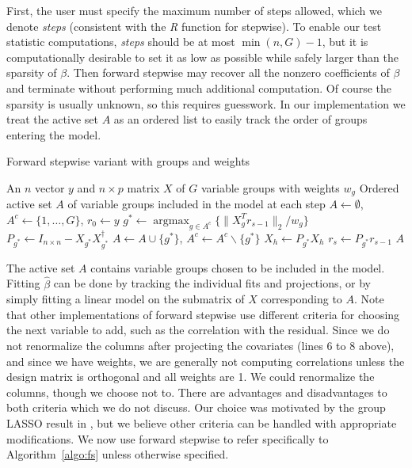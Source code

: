 \documentclass{imsart}
\newcommand{\argmax}{\mathop{\mathrm{argmax}}}
\newcommand{\norm}[1]{\lVert #1 \rVert}
\begin{document}
First, the user must specify the maximum number of steps allowed,
which we denote \textit{steps} (consistent with the \textit{R} function
for stepwise). To enable our test statistic computations,
\textit{steps} should be at most $\min (n, G) - 1$, but it is
computationally desirable to set it as low as possible while
safely larger than the sparsity of $\beta$. 
Then forward stepwise may recover all the nonzero
coefficients of $\beta$ and terminate without performing much
additional computation.
Of course the sparsity is usually unknown, so this requires guesswork.
In our implementation we treat the active set $A$ as an ordered list to easily track the order of groups entering the model.

\begin{algorithm}
  \caption{Forward stepwise variant with groups and weights}
  \label{algo:fs}
  \begin{algorithmic}[1]
    \REQUIRE An $n$ vector $y$ and $n \times p$ matrix $X$ of $G$ variable groups with weights $w_g$
    \ENSURE Ordered active set $A$ of variable groups included in the model at each step
    \STATE $A \gets \emptyset$, $A^c \gets \{ 1, \ldots, G\}$, $r_0 \gets y$
    \STATE $g^* \gets \argmax_{g \in A^c} \{ \norm{X_g^Tr_{s-1}}_2 / w_g \}$
    \STATE $P_{g^*} \gets I_{n\times n} - X_{g^*}X_{g^*}^\dagger$
    \STATE $A \gets A \cup \{ g^* \}$, $A^c \gets A^c \backslash \{ g^* \}$
      \STATE $X_h \gets P_{g^*} X_h$
    \ENDFOR
    \STATE $r_s \gets P_{g^*} r_{s-1}$
    \ENDFOR
    \RETURN $A$
  \end{algorithmic}
\end{algorithm}

The active set $A$ contains variable groups chosen to be included in
the model. Fitting $\hat \beta$ can be done by tracking the individual
fits and projections, or by simply fitting a linear model on the submatrix
of $X$ corresponding to $A$. 
 Note that other
implementations of forward stepwise use different criteria for choosing
the next variable to add, such as the correlation with the residual.
Since we do not renormalize the columns after projecting the covariates
(lines 6 to 8 above), and since we have weights, we are generally not computing
correlations unless the design matrix is orthogonal and all weights are 1. We could
renormalize the columns, though we choose not to.
There are advantages and disadvantages to both criteria which we do not
discuss. Our choice was motivated by the group LASSO result in
\cite{tests:adaptive}, but we believe other criteria can be handled
with appropriate modifications.
We now use forward stepwise to refer specifically to
Algorithm~\ref{algo:fs} unless otherwise specified.
\end{document}
